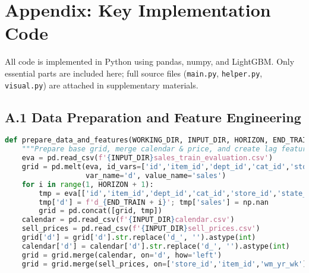 \documentclass[12pt,a4paper]{article}
\begin{document}
\newpage
\appendix
\section*{Appendix: Key Implementation Code}

All code is implemented in Python using pandas, numpy, and LightGBM.  
Only essential parts are included here; full source files (\texttt{main.py}, \texttt{helper.py}, \texttt{visual.py}) are attached in supplementary materials.

\subsection*{A.1 Data Preparation and Feature Engineering}
\begin{lstlisting}[language=Python]
def prepare_data_and_features(WORKING_DIR, INPUT_DIR, HORIZON, END_TRAIN):
    """Prepare base grid, merge calendar & price, and create lag features."""
    eva = pd.read_csv(f'{INPUT_DIR}sales_train_evaluation.csv')
    grid = pd.melt(eva, id_vars=['id','item_id','dept_id','cat_id','store_id','state_id'],
                   var_name='d', value_name='sales')
    for i in range(1, HORIZON + 1):
        tmp = eva[['id','item_id','dept_id','cat_id','store_id','state_id']].drop_duplicates()
        tmp['d'] = f'd_{END_TRAIN + i}'; tmp['sales'] = np.nan
        grid = pd.concat([grid, tmp])
    calendar = pd.read_csv(f'{INPUT_DIR}calendar.csv')
    sell_prices = pd.read_csv(f'{INPUT_DIR}sell_prices.csv')
    grid['d'] = grid['d'].str.replace('d_', '').astype(int)
    calendar['d'] = calendar['d'].str.replace('d_', '').astype(int)
    grid = grid.merge(calendar, on='d', how='left')
    grid = grid.merge(sell_prices, on=['store_id','item_id','wm_yr_wk'], how='left')
\end{lstlisting}
\end{document}
